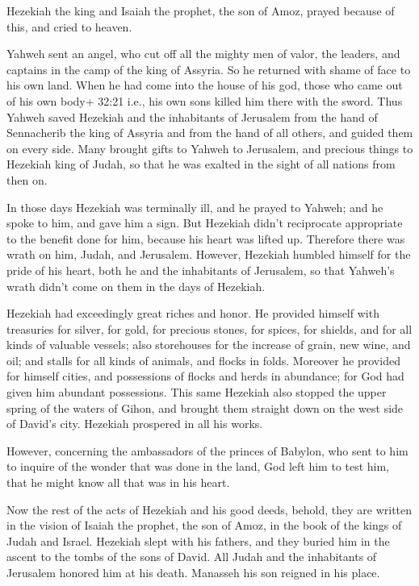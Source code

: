  Hezekiah the king and Isaiah the prophet, the son of Amoz,
prayed because of this, and cried to heaven.

 Yahweh sent an angel, who cut off all the mighty men of
valor, the leaders, and captains in the camp of the king of Assyria. So
he returned with shame of face to his own land. When he had come into
the house of his god, those who came out of his own body+ 32:21 i.e.,
his own sons killed him there with the sword.  Thus Yahweh
saved Hezekiah and the inhabitants of Jerusalem from the hand of
Sennacherib the king of Assyria and from the hand of all others, and
guided them on every side.  Many brought gifts to Yahweh to
Jerusalem, and precious things to Hezekiah king of Judah, so that he was
exalted in the sight of all nations from then on.

 In those days Hezekiah was terminally ill, and he prayed
to Yahweh; and he spoke to him, and gave him a sign.  But
Hezekiah didn't reciprocate appropriate to the benefit done for him,
because his heart was lifted up. Therefore there was wrath on him,
Judah, and Jerusalem.  However, Hezekiah humbled himself
for the pride of his heart, both he and the inhabitants of Jerusalem, so
that Yahweh's wrath didn't come on them in the days of Hezekiah.

 Hezekiah had exceedingly great riches and honor. He
provided himself with treasuries for silver, for gold, for precious
stones, for spices, for shields, and for all kinds of valuable vessels;
 also storehouses for the increase of grain, new wine, and
oil; and stalls for all kinds of animals, and flocks in folds.
 Moreover he provided for himself cities, and possessions
of flocks and herds in abundance; for God had given him abundant
possessions.  This same Hezekiah also stopped the upper
spring of the waters of Gihon, and brought them straight down on the
west side of David's city. Hezekiah prospered in all his works.

 However, concerning the ambassadors of the princes of
Babylon, who sent to him to inquire of the wonder that was done in the
land, God left him to test him, that he might know all that was in his
heart.

 Now the rest of the acts of Hezekiah and his good deeds,
behold, they are written in the vision of Isaiah the prophet, the son of
Amoz, in the book of the kings of Judah and Israel. 
Hezekiah slept with his fathers, and they buried him in the ascent to
the tombs of the sons of David. All Judah and the inhabitants of
Jerusalem honored him at his death. Manasseh his son reigned in his
place.

